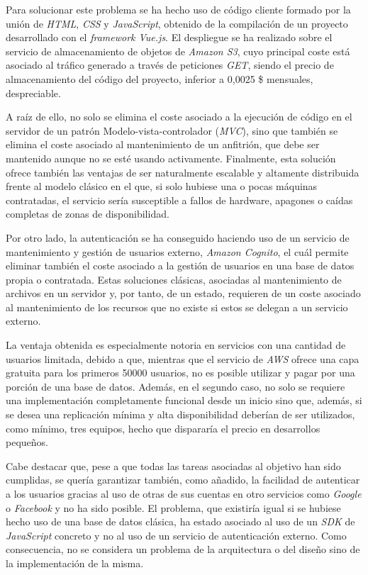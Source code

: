 \documentclass[11pt,spanish,listoffigures]{tfgetsinf}
\begin{document}
Para solucionar este problema se ha hecho uso de código cliente formado por la unión de \textit{HTML}, \textit{CSS} y \textit{JavaScript}, obtenido de la compilación de un proyecto desarrollado con el \textit{framework Vue.js}. El despliegue se ha realizado sobre el servicio de almacenamiento de objetos de \textit{Amazon S3}, cuyo principal coste está asociado al tráfico generado a través de peticiones \textit{GET}, siendo el precio de almacenamiento del código del proyecto, inferior a 0,0025 \$ mensuales, despreciable. 

A raíz de ello, no solo se elimina el coste asociado a la ejecución de código en el servidor de un patrón Modelo-vista-controlador (\textit{MVC}), sino que también se elimina el coste asociado al mantenimiento de un anfitrión, que debe ser mantenido aunque no se esté usando activamente. Finalmente, esta solución ofrece también las ventajas de ser naturalmente escalable y altamente distribuida frente al modelo clásico en el que, si solo hubiese una o pocas máquinas contratadas, el servicio sería susceptible a fallos de hardware, apagones o caídas completas de zonas de disponibilidad.

Por otro lado, la autenticación se ha conseguido haciendo uso de un servicio de mantenimiento y gestión de usuarios externo, \textit{Amazon Cognito}, el cuál permite eliminar también el coste asociado a la gestión de usuarios en una base de datos propia o contratada. Estas soluciones clásicas, asociadas al mantenimiento de archivos en un servidor y, por tanto, de un estado, requieren de un coste asociado al mantenimiento de los recursos que no existe si estos se delegan a un servicio externo.
 
La ventaja obtenida es especialmente notoria en servicios con una cantidad de usuarios limitada, debido a que, mientras que el servicio de \textit{AWS} ofrece una capa gratuita para los primeros 50000 usuarios, no es posible utilizar y pagar por una porción de una base de datos. Además, en el segundo caso, no solo se requiere una implementación completamente funcional desde un inicio sino que, además, si se desea una replicación mínima y alta disponibilidad deberían de ser utilizados, como mínimo, tres equipos, hecho que dispararía el precio en desarrollos pequeños. 

Cabe destacar que, pese a que todas las tareas asociadas al objetivo han sido cumplidas, se quería garantizar también, como añadido, la facilidad de autenticar a los usuarios gracias al uso de otras de sus cuentas en otro servicios como \textit{Google} o \textit{Facebook} y no ha sido posible. El problema, que existiría igual si se hubiese hecho uso de una base de datos clásica, ha estado asociado al uso de un \textit{SDK} de \textit{JavaScript} concreto y no al uso de un servicio de autenticación externo. Como consecuencia, no se considera un problema de la arquitectura o del diseño sino de la implementación de la misma.
\end{document}
